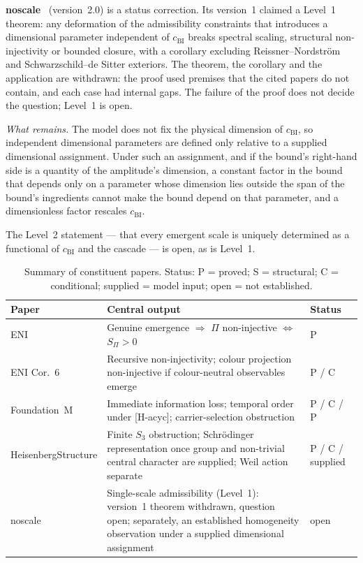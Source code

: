 \documentclass[11pt,a4paper]{article}
\theoremstyle{definition}
\newcommand{\cchi}{c_{\mathrm{BI}}}
\begin{document}
      \textbf{noscale}~\cite{Beau2026j} (version~2.0) is a status correction.
      Its version~1 claimed a Level~1 theorem: any deformation of the admissibility constraints
      that introduces a dimensional parameter independent of $\cchi$ breaks spectral scaling,
      structural non-injectivity or bounded closure, with a corollary excluding
      Reissner--Nordstr\"{o}m and Schwarzschild--de Sitter exteriors.
      The theorem, the corollary and the application are withdrawn: the proof used premises that the
      cited papers do not contain, and each case had internal gaps.
      The failure of the proof does not decide the question; Level~1 is open.

      \textit{What remains.}
      The model does not fix the physical dimension of $\cchi$, so independent dimensional
      parameters are defined only relative to a supplied dimensional assignment.
      Under such an assignment, and if the bound's right-hand side is a quantity of the amplitude's
      dimension, a constant factor in the bound that depends only on a parameter whose dimension
      lies outside the span of the bound's ingredients cannot make the bound depend on that
      parameter, and a dimensionless factor rescales $\cchi$.

      The Level~2 statement --- that every emergent scale is uniquely determined as a functional
      of $\cchi$ and the cascade --- is open, as is Level~1.

      \begin{table}[ht]
        \centering
        \caption{Summary of constituent papers.
        Status: P = proved; S = structural; C = conditional; supplied = model input;
        open = not established.}
        \label{tab:papers}
        \renewcommand{\arraystretch}{1.2}
        \begin{tabular}{@{}lp{8.2cm}l@{}}
          \toprule
          Paper & Central output & Status \\
          \midrule
          ENI & Genuine emergence $\Rightarrow$ $\Pi$ non-injective $\Leftrightarrow$ $S_\Pi > 0$ & P \\
          ENI Cor.~6 & Recursive non-injectivity; colour projection non-injective if colour-neutral
          observables emerge & P / C \\
          Foundation~M & Immediate information loss; temporal order under [H-acyc];
          carrier-selection obstruction & P / C / P \\
          HeisenbergStructure & Finite $S_3$ obstruction; Schr\"odinger representation once group and
          non-trivial central character are supplied; Weil action separate & P / C / supplied \\
          noscale & Single-scale admissibility (Level~1): version~1 theorem withdrawn, question open;
          separately, an established homogeneity observation under a supplied dimensional assignment & open \\
          \bottomrule
        \end{tabular}
      \end{table}
\end{document}
